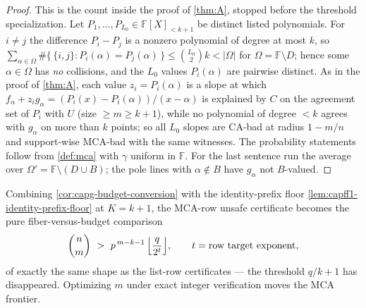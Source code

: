 \documentclass[11pt]{article}
\theoremstyle{definition}
\theoremstyle{remark}
\newcommand{\F}{\mathbb{F}}
\newcommand{\B}{B}
\begin{document}
\begin{proof}
This is the count inside the proof of \cref{thm:A}, stopped before the
threshold specialization.  Let $P_1,\dots,P_{L_0}\in\F[X]_{<k+1}$ be
distinct listed polynomials.  For $i\ne j$ the difference $P_i-P_j$ is a
nonzero polynomial of degree at most $k$, so
$\sum_{\alpha\in\Omega}\#\{\,\{i,j\}:P_i(\alpha)=P_j(\alpha)\,\}
\le\binom{L_0}2k<|\Omega|$ for $\Omega=\F\setminus D$; hence some
$\alpha\in\Omega$ has \emph{no} collisions, and the $L_0$ values
$P_i(\alpha)$ are pairwise distinct.  As in the proof of \cref{thm:A},
each value $z_i=P_i(\alpha)$ is a slope at which
$f_\alpha+z_ig_\alpha=(P_i(x)-P_i(\alpha))/(x-\alpha)$ is explained by
$C$ on the agreement set of $P_i$ with $U$ (size $\ge m\ge k+1$), while no
polynomial of degree $<k$ agrees with $g_\alpha$ on more than $k$ points;
so all $L_0$ slopes are CA-bad at radius $1-m/n$ and support-wise MCA-bad
with the same witnesses.  The probability statements follow from
\cref{def:mca} with $\gamma$ uniform in $\F$.  For the last sentence run
the average over $\Omega'=\F\setminus(D\cup\B)$; the pole lines with
$\alpha\notin\B$ have $g_\alpha$ not $\B$-valued.
\end{proof}

Combining \cref{cor:capg-budget-conversion} with the identity-prefix floor
\cref{lem:capff1-identity-prefix-floor} at $K=k+1$, the MCA-row unsafe
certificate becomes the pure fiber-versus-budget comparison
\[
        \binom nm\ >\ p^{\,m-k-1}\,\Bigl\lfloor\frac{q}{2^{t}}\Bigr\rfloor ,
        \qquad t=\text{row target exponent},
\]
of exactly the same shape as the list-row certificates --- the threshold
$q/k+1$ has disappeared.  Optimizing $m$ under exact integer verification
moves the MCA frontier.
\end{document}
